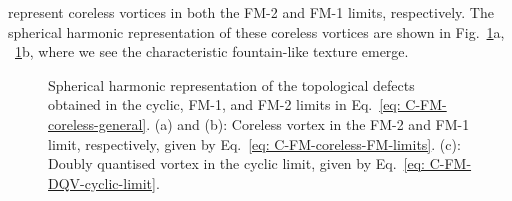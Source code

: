 represent coreless vortices in both the FM-2 and FM-1 limits, respectively.
The spherical harmonic representation of these coreless vortices are shown
in Fig.~\ref{fig: C-FM-coreless-initial-states}a,
~\ref{fig: C-FM-coreless-initial-states}b, where we see the characteristic
fountain-like texture emerge.
\begin{figure}
    \centering
    \caption[Spherical harmonic representation of a coreless vortex connection
        across a cyclic to ferromagnetic interface]
    {\label{fig: C-FM-coreless-initial-states}Spherical harmonic
        representation of the topological defects obtained in the cyclic, FM-1,
        and FM-2 limits in Eq.~\eqref{eq: C-FM-coreless-general}.
        (a) and (b): Coreless vortex in the FM-2 and FM-1 limit, respectively,
        given by Eq.~\eqref{eq: C-FM-coreless-FM-limits}.
        (c): Doubly quantised vortex in the cyclic limit, given by
        Eq.~\eqref{eq: C-FM-DQV-cyclic-limit}.}
\end{figure}
